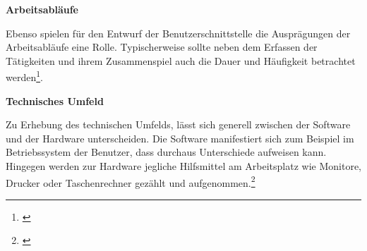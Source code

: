 \textbf{Arbeitsabläufe}

Ebenso spielen für den Entwurf der Benutzerschnittstelle die Ausprägungen der Arbeitsabläufe eine Rolle. Typischerweise sollte neben dem Erfassen der Tätigkeiten und ihrem Zusammenspiel auch die Dauer und Häufigkeit betrachtet werden\footnote{\cite[vgl.][28]{Ecker2016}}.

\textbf{Technisches Umfeld}

Zu Erhebung des technischen Umfelds, lässt sich generell zwischen der Software und der Hardware unterscheiden. Die Software manifestiert sich zum Beispiel im Betriebssystem der Benutzer, dass durchaus Unterschiede aufweisen kann. Hingegen werden zur Hardware jegliche Hilfsmittel am Arbeitsplatz wie Monitore, Drucker oder Taschenrechner gezählt und aufgenommen.\footnote{\cite[vgl.][28]{Ecker2016}}

